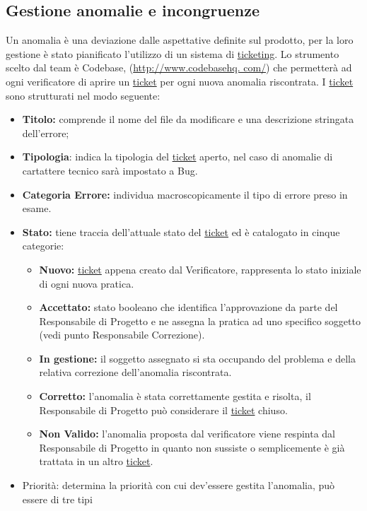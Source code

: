 \subsection{Gestione anomalie e incongruenze}
Un anomalia è una deviazione dalle aspettative definite sul prodotto, per la loro gestione è stato pianificato l'utilizzo di un sistema di \underline{ticketing}.
Lo strumento scelto dal team è Codebase, (\url{http://www.codebasehq. com/}) che permetterà ad ogni verificatore di aprire un \underline{ticket} per ogni nuova anomalia riscontrata.
I \underline{ticket} sono strutturati nel modo seguente:
\begin{itemize}
\item \textbf{Titolo:} comprende il nome del file da modificare e una descrizione stringata dell'errore;
\item \textbf{Tipologia}: indica la tipologia del \underline{ticket} aperto, nel caso di anomalie di cartattere tecnico sarà impostato a Bug.
\item \textbf{Categoria Errore:} individua macroscopicamente il tipo di errore preso in esame.
\item \textbf{Stato:} tiene traccia dell'attuale stato del \underline{ticket} ed è catalogato in cinque categorie:
\begin{itemize}
\item \textbf{Nuovo:} \underline{ticket} appena creato dal Verificatore, rappresenta lo stato iniziale di ogni nuova pratica.
\item \textbf{Accettato:} stato booleano che identifica l'approvazione da parte del Responsabile di Progetto e ne assegna la pratica ad uno specifico soggetto (vedi punto Responsabile Correzione).
\item \textbf{In gestione:} il soggetto assegnato si sta occupando del problema e della relativa correzione dell'anomalia riscontrata.
\item \textbf{Corretto:} l'anomalia è stata correttamente gestita e risolta, il Responsabile di Progetto può considerare il \underline{ticket} chiuso.
\item \textbf{Non Valido:} l'anomalia proposta dal verificatore viene respinta dal Responsabile di Progetto in quanto non sussiste o semplicemente è già trattata in un altro \underline{ticket}.
\end{itemize}
\item Priorità: determina la priorità con cui dev'essere gestita l'anomalia, può essere di tre tipi
\end{itemize}
